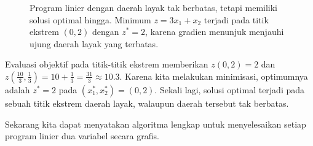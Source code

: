 \begin{solution}
\begin{figure}[H]
\caption{Program linier dengan daerah layak tak berbatas, tetapi memiliki solusi optimal hingga. Minimum $z = 3x_1+x_2$ terjadi pada titik ekstrem $(0,2)$ dengan $z^* = 2$, karena gradien menunjuk menjauhi ujung daerah layak yang terbatas.}
\label{fig:LPUnboundFeasibleRegion2}
\end{figure}

Evaluasi objektif pada titik-titik ekstrem memberikan $z(0,2) = 2$ dan $z(\tfrac{10}{3},\tfrac{1}{3}) = 10 + \tfrac{1}{3} = \tfrac{31}{3} \approx 10.3$. Karena kita melakukan minimisasi, optimumnya adalah $z^* = 2$ pada $(x_1^*,x_2^*) = (0,2)$. Sekali lagi, solusi optimal terjadi pada sebuah titik ekstrem daerah layak, walaupun daerah tersebut tak berbatas.
\label{ex:LPUnboundFeasibleRegion2}
\end{solution}

Sekarang kita dapat menyatakan algoritma lengkap untuk menyelesaikan setiap program linier dua variabel secara grafis.

